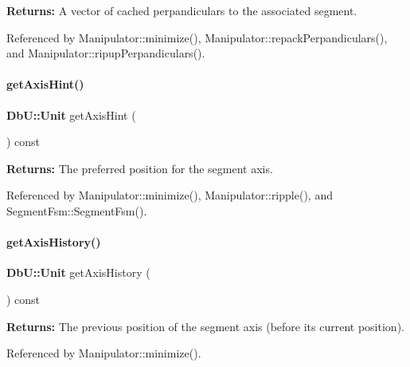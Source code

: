 {\bfseries Returns\+:} A vector of cached perpandiculars to the associated segment. 

Referenced by Manipulator\+::minimize(), Manipulator\+::repack\+Perpandiculars(), and Manipulator\+::ripup\+Perpandiculars().

\mbox{\label{classKite_1_1RoutingEvent_ab94e1b7e323c5344019d6ea545e3ea05}} 
\paragraph{\texorpdfstring{get\+Axis\+Hint()}{getAxisHint()}}
{\footnotesize\ttfamily \textbf{ Db\+U\+::\+Unit} get\+Axis\+Hint (\begin{DoxyParamCaption}{ }\end{DoxyParamCaption}) const\hspace{0.3cm}{\ttfamily [inline]}}

{\bfseries Returns\+:} The preferred position for the segment axis. 

Referenced by Manipulator\+::minimize(), Manipulator\+::ripple(), and Segment\+Fsm\+::\+Segment\+Fsm().

\mbox{\label{classKite_1_1RoutingEvent_ad1c8d7db376d2e0b99eb1f54df29dc71}} 
\paragraph{\texorpdfstring{get\+Axis\+History()}{getAxisHistory()}}
{\footnotesize\ttfamily \textbf{ Db\+U\+::\+Unit} get\+Axis\+History (\begin{DoxyParamCaption}{ }\end{DoxyParamCaption}) const\hspace{0.3cm}{\ttfamily [inline]}}

{\bfseries Returns\+:} The previous position of the segment axis (before it\textquotesingle{}s current position). 

Referenced by Manipulator\+::minimize().

\mbox{\label{classKite_1_1RoutingEvent_aef5716e4b434aae813b1067a908f8b1a}} 
